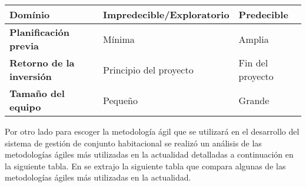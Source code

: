 \begin{table}[H]
\begin{footnotesize}
\begin{tabular}{ |>{\bfseries}l|l|l| }
        \hline
        Domínio                                      & Impredecible/Exploratorio                        & Predecible                                               \\
        \hline
        Planificación previa                         & Mínima                                           & Amplia                                                   \\
        \hline
        Retorno de la inversión                      & Principio del proyecto                           & Fin del proyecto                                         \\
        \hline
        Tamaño del equipo                            & Pequeño                                          & Grande                                                   \\
        \hline
    \end{tabular}
    \end{footnotesize}
\end{table}

Por otro lado para escoger la metodología ágil que se utilizará en el desarrollo del sistema de gestión de conjunto habitacional se realizó un análisis de las metodologías ágiles más utilizadas en la actualidad detalladas a continuación en la siguiente tabla.
En \cite{barriga_sanchez_sistema_2023} se extrajo la siguiente tabla que compara algunas de las metodologías ágiles más utilizadas en la actualidad.

